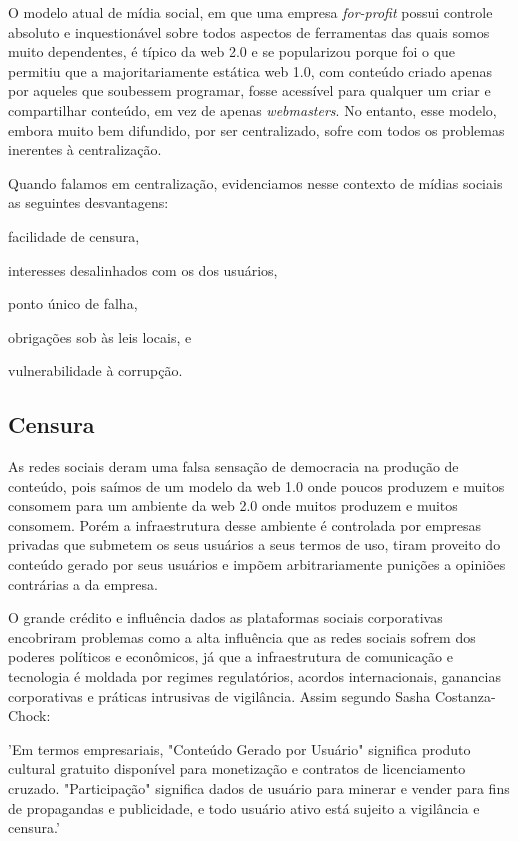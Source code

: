 O modelo atual de mídia social, em que uma empresa \textit{for-profit} possui controle absoluto e inquestionável sobre todos aspectos de ferramentas das quais somos muito dependentes, é típico da web 2.0 e se popularizou porque foi o que permitiu que a majoritariamente estática web 1.0, com conteúdo criado apenas por aqueles que soubessem programar, fosse acessível para qualquer um criar e compartilhar conteúdo, em vez de apenas \textit{webmasters}.
No entanto, esse modelo, embora muito bem difundido, por ser centralizado, sofre com todos os problemas inerentes à centralização. 

Quando falamos em centralização, evidenciamos nesse contexto de mídias sociais as seguintes desvantagens:
\begin{enumerate*}[label=(\arabic*)]
    \item facilidade de censura,
    \item interesses desalinhados com os dos usuários,
    \item ponto único de falha,
    \item obrigações sob às leis locais, e
    \item vulnerabilidade à corrupção.
\end{enumerate*}

\subsection{Censura}
As redes sociais deram uma falsa sensação de democracia na produção de conteúdo, pois saímos de um modelo da web 1.0 onde poucos produzem e muitos consomem para um ambiente da web 2.0 onde muitos produzem e muitos consomem. Porém a infraestrutura desse ambiente é controlada por empresas privadas que submetem os seus usuários a seus termos de uso, tiram proveito do conteúdo gerado por seus usuários e impõem arbitrariamente punições a opiniões contrárias a da empresa.

O grande crédito e influência dados as plataformas sociais corporativas encobriram  problemas como a alta influência que as redes sociais sofrem dos poderes políticos e econômicos, já que a infraestrutura de comunicação e tecnologia é moldada por regimes regulatórios, acordos internacionais, ganancias corporativas e práticas intrusivas de vigilância. Assim segundo Sasha Costanza-Chock\cite{Censura1}:


\begin{directcite}
'Em termos empresariais, "Conteúdo Gerado por Usuário" significa produto cultural gratuito disponível para monetização e contratos de licenciamento cruzado. "Participação" significa dados de usuário para minerar e vender para fins de propagandas e publicidade, e todo usuário ativo está sujeito a vigilância e censura.'
\end{directcite}


